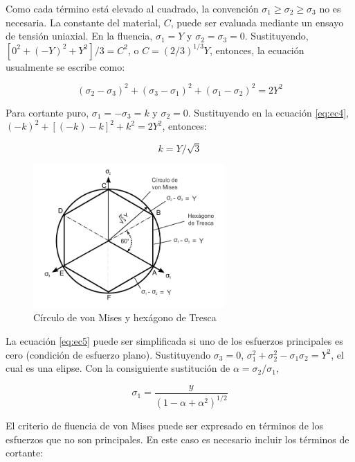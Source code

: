 Como cada término está elevado al cuadrado, la convención $\sigma_1 \geq \sigma_2 \geq \sigma_3$ no es necesaria. 
La constante del material, $C$, puede ser evaluada mediante un ensayo de tensión uniaxial. En la fluencia, 
$\sigma_1 = Y$ y $\sigma_2 = \sigma_3 = 0$. Sustituyendo, $[0^2 + (-Y)^2 + Y^2]/3 = C^2$, o 
$C = (2/3)^{1/3} Y $, entonces, la ecuación usualmente se escribe como:

\begin{equation}\label{eq:ec4}
(\sigma_2-\sigma_3)^2 + (\sigma_3-\sigma_1 )^2 + (\sigma_1-\sigma_2 )^2 = 2Y^2
\end{equation}

Para cortante puro, $\sigma_1 = -\sigma_3 = k$ y $\sigma_2=0$. Sustituyendo en la ecuación \ref{eq:ec4}, 
$ (-k)^2 + [ (-k)-k ]^2 + k^2 = 2Y^2 $, entonces:

\begin{equation}\label{eq:ec5}
k = Y / \sqrt{3}
\end{equation}

\begin{figure}[!h]
\centering
\includegraphics[width=0.65\textwidth]{src/ch2/mises_tresca.pdf}
\caption{Círculo de von Mises y hexágono de Tresca}
\label{fig:mises_tresca}
\end{figure}

La ecuación \ref{eq:ec5} puede ser simplificada si uno de los esfuerzos principales es cero (condición de esfuerzo plano). 
Sustituyendo $\sigma_3 = 0$, $\sigma_1^2 + \sigma_2^2 - \sigma_1 \sigma_2 = Y^2$, el cual es una elipse. Con la 
consiguiente sustitución de $\alpha = \sigma_2/\sigma_1$,

\begin{equation}
\sigma_1 = \frac{y}{(1-\alpha+\alpha^2)^{1/2}}
\end{equation}

El criterio de fluencia de von Mises puede ser expresado en términos de los esfuerzos que no son principales. 
En este caso es necesario incluir los términos de cortante:

